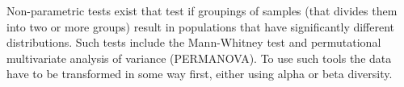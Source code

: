 Non-parametric tests exist that test if groupings of samples (that divides them into two or more groups) result in populations that have significantly different distributions. Such tests include the Mann-Whitney test and permutational multivariate analysis of variance (PERMANOVA). To use such tools the data have to be transformed in some way first, either using alpha or beta diversity. 
%
%	
%	

